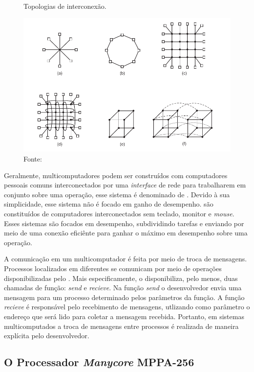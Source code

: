 \begin{figure}[t]
	\centering
        \caption{Topologias de interconexão.}
	\includegraphics[width=\textwidth]{figs/topologia.pdf}
    \caption*{Fonte: \cite{Tanenbaum2015}}
    \label{fig:topologia}
\end{figure}


Geralmente, multicomputadores podem ser construídos com computadores pessoais
comuns interconectados por uma \textit{interface} de rede para trabalharem em
conjunto sobre uma operação, esse sistema é denominado de \now. Devido à sua
simplicidade, esse sistema não é focado em ganho de desempenho. \cow
são constituídos de computadores interconectados sem teclado, monitor e \textit{mouse}. Esses
sistemas são focados em desempenho, subdividindo tarefas e enviando por meio de
uma conexão eficiênte para ganhar o máximo em desempenho sobre uma operação.

A comunicação em um multicomputador é feita por meio de troca de mensagens.
Processos localizados em diferentes \cpus se comunicam por meio de operações
disponibilizadas pelo \so. Mais especificamente, o \so disponibiliza, pelo
menos, duas chamadas de função: \textit{send} e  \textit{recieve}. Na função
\textit{send} o desenvolvedor envia uma mensagem para um processo determinado pelos
parâmetros da função. A função \textit{recieve} é responsável pelo recebimento
de mensagens, utlizando como parâmetro o endereço que será lido para coletar a
mensagem recebida. Portanto, em sistemas multicomputados a troca de mensagens
entre processos é realizada de maneira explícita pelo desenvolvedor.


\subsection{O Processador \textit{Manycore} MPPA-256}

